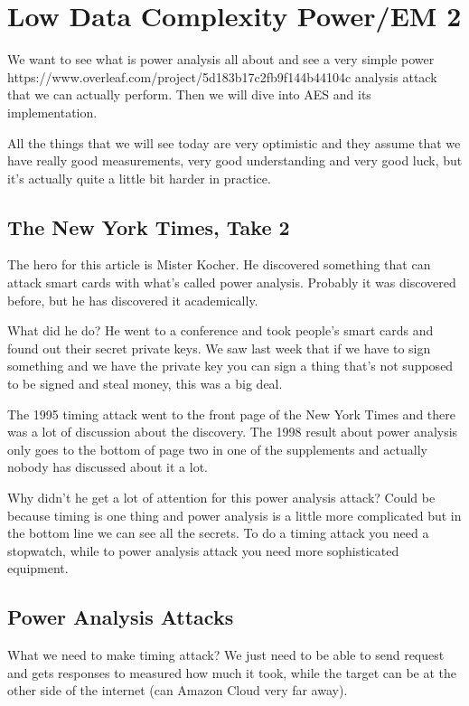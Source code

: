\documentclass{report}
\begin{document}
  
\chapter{Low Data Complexity Power/EM 2}

We want to see what is power analysis all about and see a very simple power https://www.overleaf.com/project/5d183b17c2fb9f144b44104c analysis attack that we can actually perform. Then we will dive into AES and its implementation.

All the things that we will see today are very optimistic and they assume that we have really good measurements, very good understanding and very good luck, but it's actually quite a little bit harder in practice.

\section{The New York Times, Take 2}
The hero for this article is Mister Kocher. He discovered something that can attack smart cards with what's called power analysis. Probably it was discovered before, but he has discovered it academically.

What did he do? He went to a conference and took people's smart cards and found out their secret private keys. We saw last week that if we have to sign something and we have the private key you can sign a thing that's not supposed to be signed and steal money, this was a big deal.

The 1995 timing attack went to the front page of the New York Times and there was a lot of discussion about the discovery. The 1998 result about power analysis only goes to the bottom of page two in one of the supplements and actually nobody has discussed about it a lot. 

Why didn't he get a lot of attention for this power analysis attack?
Could be because timing is one thing and power analysis is a little more complicated but in the bottom line we can see all the secrets.
To do a timing attack you need a stopwatch, while to power analysis attack you need more sophisticated equipment.

\section{Power Analysis Attacks}
What we need to make timing attack? We just need to be able to send request and gets responses to measured how much it took, while the target can be at the other side of the internet (can Amazon Cloud very far away).
\end{document}
